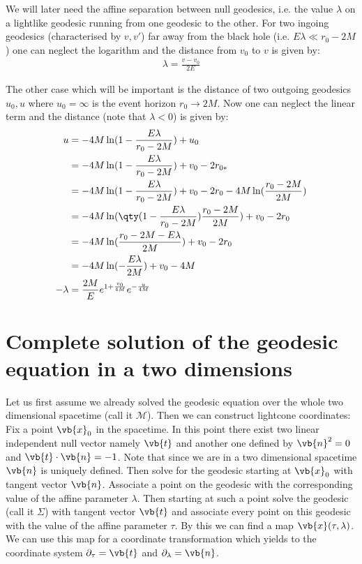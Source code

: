 We will later need the affine separation between null geodesics, i.e. the value \(\lambda\) on a lightlike geodesic running from one geodesic to the other. For two ingoing geodesics (characterised by \(v, v'\)) far away from the black hole (i.e. \(E\lambda \ll r_0 - 2M\)) one can neglect the logarithm and the distance from \(v_0\) to \(v\) is given by:
\begin{align}
\lambda = \frac{v - v_0}{2E} 
\label{equ:bh_in_simplified}
\end{align}

The other case which will be important is the distance of two outgoing geodesics \(u_0, u\) where \(u_0 = \infty\) is the event horizon \(r_0 \to 2M\). Now one can neglect the linear term and the distance (note that \(\lambda <0\)) is given by:
\begin{align}
u &= - 4M\ln(1 - \frac{E\lambda}{r_0-2M}) + u_0\\
	&= - 4M\ln(1 - \frac{E\lambda}{r_0-2M}) + v_0 - 2r_{0*}\\
	&= - 4M\ln(1 - \frac{E\lambda}{r_0-2M}) + v_0 - 2r_0 - 4M\ln(\frac{r_0-2M}{2M})\\
	&= - 4M\ln(\qty(1 - \frac{E\lambda}{r_0-2M})\frac{r_0-2M}{2M}) + v_0 - 2r_0\\
	&= - 4M\ln(\frac{r_0 - 2M - E\lambda}{2M}) + v_0 - 2r_0\\
	&= - 4M\ln(-\frac{E\lambda}{2M}) + v_0 - 4M\\
-\lambda &= \frac{2M}{E}e^{1+\frac{v_0}{4M}} e^{-\frac{u}{4M}}
\label{equ:bh_out_simplified}
\end{align} 

\section{Complete solution of the geodesic equation in a two dimensions}
\label{sec:app_congruence}
Let us first assume we already solved the geodesic equation over the whole two dimensional spacetime (call it \(\mathcal{M}\)). Then we can construct lightcone coordinates: Fix a point \(\vb{x}_0\) in the spacetime. In this point there exist two linear independent null vector namely \(\vb{t}\) and another one defined by \(\vb{n}^2 = 0\) and \(\vb{t}\cdot\vb{n} = -1\). Note that since we are in a two dimensional spacetime \(\vb{n}\) is uniquely defined. Then solve for the geodesic starting at \(\vb{x}_0\) with tangent vector \(\vb{n}\). Associate a point on the geodesic with the corresponding value of the affine parameter \(\lambda\). Then starting at such a point solve the geodesic (call it \(\Sigma\)) with tangent vector \(\vb{t}\) and associate every point on this geodesic with the value of the affine parameter \(\tau\). By this we can find a map \(\vb{x}(\tau,\lambda)\). We can use this map for a coordinate transformation which yields to the coordinate system \(\partial_\tau = \vb{t}\) and \(\partial_\lambda = \vb{n}\).


